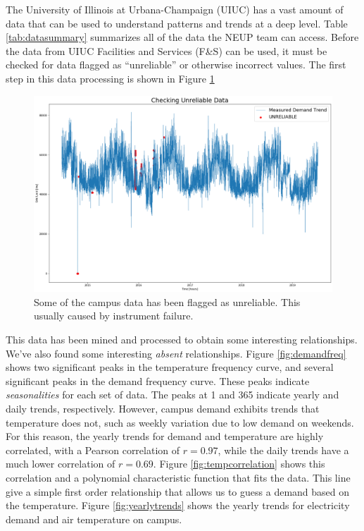 The University of Illinois at Urbana-Champaign (UIUC) has a vast amount of
data that can be used to understand patterns and trends at a deep level. Table \ref{tab:datasummary} summarizes all of the data the NEUP team can access.
Before the data from UIUC Facilities and Services (F\&S) can be used, it must
be checked for data flagged as ``unreliable'' or otherwise incorrect values.
The first step in this data processing is shown in Figure \ref{fig:unreliable}
\begin{figure}[H]
  \centering
  \includegraphics[width=\textwidth]{unreliable}
  \caption{Some of the campus data has been flagged as unreliable. This usually caused by instrument failure.}
  \label{fig:unreliable}
\end{figure}
This data has been mined and processed to obtain some interesting relationships.
We've also found some interesting \textit{absent} relationships. Figure \ref{fig:demandfreq} shows two significant peaks in the temperature frequency
curve, and several significant peaks in the demand frequency curve. These peaks
indicate \textit{seasonalities} for each set of data. The peaks at 1 and 365
indicate yearly and daily trends, respectively. However, campus demand exhibits
trends that temperature does not, such as weekly variation due to low demand
on weekends. For this reason, the yearly trends for demand and temperature are
highly correlated, with a Pearson correlation of $r=0.97$, while the daily trends have a much lower correlation of $r=0.69$. Figure \ref{fig:tempcorrelation} shows this correlation and a polynomial characteristic
function that fits the data. This line give a simple first order relationship
that allows us to guess a demand based on the temperature. Figure
\ref{fig:yearlytrends} shows the yearly trends for electricity demand and air
temperature on campus.


